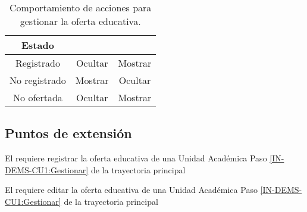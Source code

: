 \begin{table}[htbp]
	\begin{center}
		\begin{tabular}{|c|c|c|}
			\hline
			Estado & \IUArchivo & \IUEditar \\
			\hline \hline
			Registrado & Ocultar & Mostrar \\ \hline
			No registrado & Mostrar & Ocultar \\ \hline
			No ofertada & Ocultar & Mostrar \\ \hline
		\end{tabular}
		\caption{Comportamiento de acciones para gestionar la oferta educativa.}
		\label{TablaComportamiento-IN-DEMS-CU1}
	\end{center}
\end{table}

\subsection{Puntos de extensión}	 

{El  requiere registrar la oferta educativa de una Unidad Académica}
{Paso \ref{IN-DEMS-CU1:Gestionar} de la trayectoria principal}
{}

{El  requiere editar la oferta educativa de una Unidad Académica}
{Paso \ref{IN-DEMS-CU1:Gestionar} de la trayectoria principal}
{}